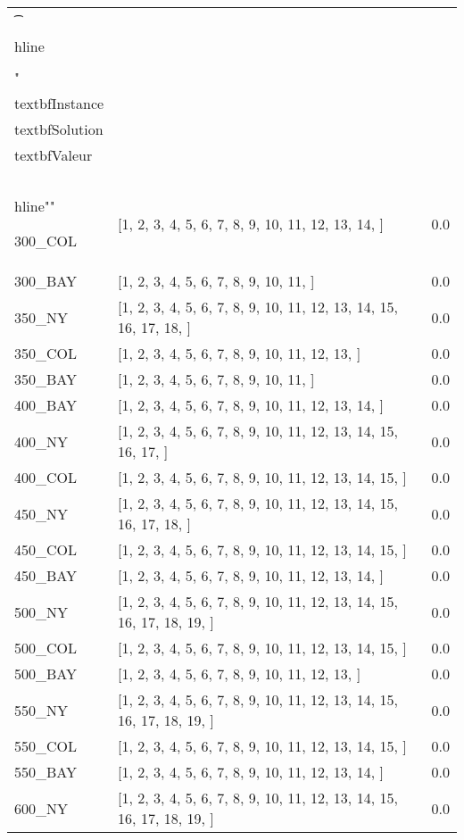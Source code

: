 \documentclass[main.tex]{subfiles}
\begin{document}
\begin{center}
\renewcommand{\arraystretch}{1.4} 
\begin{tabular}{llr}\n\t\\hline\n\\\\\n
"\\textbf{Instance} & \\textbf{Solution} & \\textbf{Valeur} \\\\\\hline\n""

300\_COL & [1, 2, 3, 4, 5, 6, 7, 8, 9, 10, 11, 12, 13, 14, ] & 0.0\\
300\_BAY & [1, 2, 3, 4, 5, 6, 7, 8, 9, 10, 11, ] & 0.0\\
350\_NY & [1, 2, 3, 4, 5, 6, 7, 8, 9, 10, 11, 12, 13, 14, 15, 16, 17, 18, ] & 0.0\\
350\_COL & [1, 2, 3, 4, 5, 6, 7, 8, 9, 10, 11, 12, 13, ] & 0.0\\
350\_BAY & [1, 2, 3, 4, 5, 6, 7, 8, 9, 10, 11, ] & 0.0\\
400\_BAY & [1, 2, 3, 4, 5, 6, 7, 8, 9, 10, 11, 12, 13, 14, ] & 0.0\\
400\_NY & [1, 2, 3, 4, 5, 6, 7, 8, 9, 10, 11, 12, 13, 14, 15, 16, 17, ] & 0.0\\
400\_COL & [1, 2, 3, 4, 5, 6, 7, 8, 9, 10, 11, 12, 13, 14, 15, ] & 0.0\\
450\_NY & [1, 2, 3, 4, 5, 6, 7, 8, 9, 10, 11, 12, 13, 14, 15, 16, 17, 18, ] & 0.0\\
450\_COL & [1, 2, 3, 4, 5, 6, 7, 8, 9, 10, 11, 12, 13, 14, 15, ] & 0.0\\
450\_BAY & [1, 2, 3, 4, 5, 6, 7, 8, 9, 10, 11, 12, 13, 14, ] & 0.0\\
500\_NY & [1, 2, 3, 4, 5, 6, 7, 8, 9, 10, 11, 12, 13, 14, 15, 16, 17, 18, 19, ] & 0.0\\
500\_COL & [1, 2, 3, 4, 5, 6, 7, 8, 9, 10, 11, 12, 13, 14, 15, ] & 0.0\\
500\_BAY & [1, 2, 3, 4, 5, 6, 7, 8, 9, 10, 11, 12, 13, ] & 0.0\\
550\_NY & [1, 2, 3, 4, 5, 6, 7, 8, 9, 10, 11, 12, 13, 14, 15, 16, 17, 18, 19, ] & 0.0\\
550\_COL & [1, 2, 3, 4, 5, 6, 7, 8, 9, 10, 11, 12, 13, 14, 15, ] & 0.0\\
550\_BAY & [1, 2, 3, 4, 5, 6, 7, 8, 9, 10, 11, 12, 13, 14, ] & 0.0\\
600\_NY & [1, 2, 3, 4, 5, 6, 7, 8, 9, 10, 11, 12, 13, 14, 15, 16, 17, 18, 19, ] & 0.0\\

\end{tabular}
\end{center}
\end{document}
